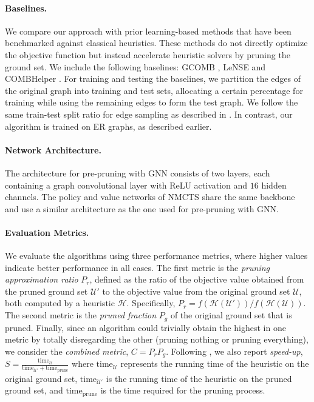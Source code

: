 \documentclass[letterpaper]{article} %
\begin{document}
\paragraph{Baselines.} We compare our approach with prior learning-based methods that have been benchmarked against classical heuristics. These methods do not directly optimize the objective function but instead accelerate heuristic solvers by pruning the ground set. We include the following baselines: GCOMB \cite{manchanda2020gcomb}, LeNSE \cite{ireland2022lense} and COMBHelper \cite{tian2024combhelper}. For training and testing the baselines, we partition the edges of the original graph into training and test sets, allocating a certain percentage for training while using the remaining edges to form the test graph. We follow the same train-test split ratio for edge sampling as described in \citet{ireland2022lense}. In contrast, our algorithm is trained on ER graphs, as described earlier.

\paragraph{Network Architecture.} The architecture for pre-pruning with GNN consists of two layers, each containing a graph convolutional layer with ReLU activation and $16$ hidden channels. The policy and value networks of NMCTS share the same backbone and use a similar architecture as the one used for pre-pruning with GNN. 


\paragraph{Evaluation Metrics.} We evaluate the algorithms using three performance metrics, where higher values indicate better performance in all cases. The first metric is the
\textit{pruning approximation ratio} $P_r$,
defined as the ratio of the objective value obtained from the pruned ground set $\mathcal{U}'$ to the objective value from the original ground set $\mathcal{U}$, both computed by a heuristic $\mathcal{H}$. Specifically, $P_r = f( \mathcal{H} (\mathcal{U}')) / f( \mathcal{H} (\mathcal{U}))$. The second metric is the
\textit{pruned fraction} $P_g$ of the original ground set that is pruned.
Finally, since an algorithm could trivially obtain the highest in one metric
by totally disregarding the other (pruning nothing or pruning everything),
we consider the \textit{combined metric}, $C = P_rP_g$. Following \citet{tian2024combhelper}, we also report \textit{speed-up}, \(  S = \frac{\text{time}_{\mathcal{U}}}{\text{time}_{\mathcal{U}'} + \text{time}_{\text{prune}}} \) where \( \text{time}_{\mathcal{U}} \) represents the running time of the heuristic on the original ground set, \( \text{time}_{\mathcal{U}'} \) is the running time of the heuristic on the pruned ground set, and \( \text{time}_{\text{prune}} \) is the time required for the pruning process.
\end{document}
